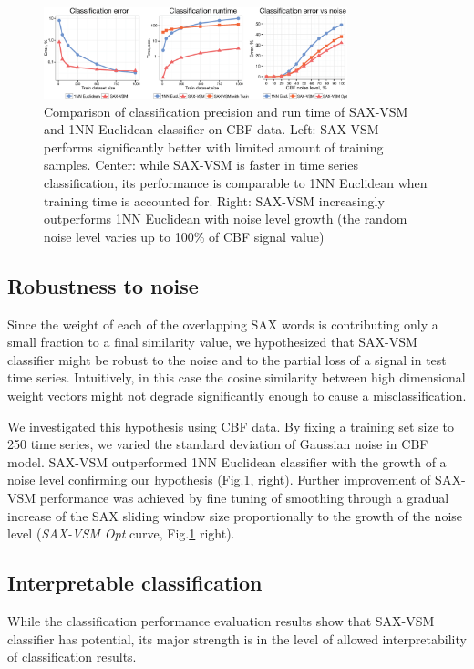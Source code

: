 \documentclass[conference]{IEEEtran}
\begin{document}
\begin{figure}[t]
   \centering
   \vspace{0.1cm}
   \includegraphics[width=88mm]{figures/precision-runtime_new.eps}
   \caption{Comparison of classification precision and run time of SAX-VSM and 1NN 
   Euclidean classifier on CBF data. 
   Left: SAX-VSM performs significantly better with limited amount of training samples. 
   Center: while SAX-VSM is faster in time series classification, its performance 
   is comparable to 1NN Euclidean when training time is accounted for.
   Right: SAX-VSM increasingly outperforms 1NN Euclidean with noise level growth 
   (the random noise level varies up to 100\% of CBF signal value)
   }
   \label{fig:precision-runtime}
   \vspace{-0.15cm}
\end{figure}

\subsection{Robustness to noise}
Since the weight of each of the overlapping SAX words is contributing only a small 
fraction to a final similarity value, we hypothesized that SAX-VSM classifier might be 
robust to the noise and to the partial loss of a signal in test time series. 
Intuitively, in this case the cosine similarity between high dimensional 
weight vectors might not degrade significantly enough to cause a misclassification.

We investigated this hypothesis using CBF data. By fixing a training set size to 250 
time series, we varied the standard deviation of Gaussian noise in CBF model.
SAX-VSM outperformed 1NN Euclidean classifier with the growth of a noise level 
confirming our hypothesis (Fig.\ref{fig:precision-runtime}, right).
Further improvement of SAX-VSM performance was achieved by fine tuning of smoothing 
through a gradual increase of the SAX sliding window size proportionally to the growth of 
the noise level (\textit{SAX-VSM Opt} curve, Fig.\ref{fig:precision-runtime} right). 

\subsection{Interpretable classification}
While the classification performance evaluation results show that SAX-VSM classifier 
has potential, its major strength is in the level of allowed interpretability of 
classification results. 
\end{document}
